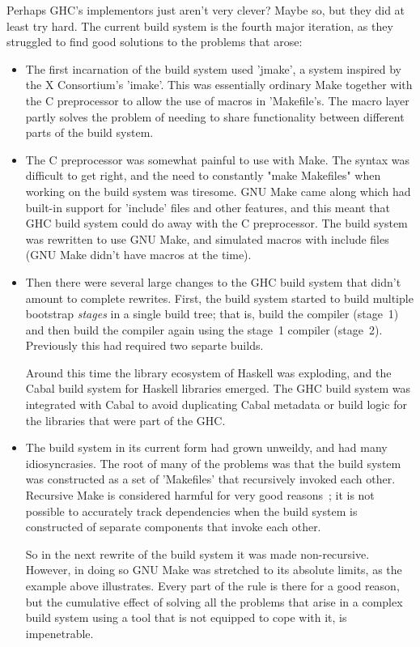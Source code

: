 Perhaps GHC's implementors just aren't very clever?  Maybe so, but
they did at least try hard. The current build system is the
fourth major iteration, as they struggled to find good solutions to the
problems that arose:

\begin{itemize}
\item The first incarnation of the build system used \lst'jmake', a
  system inspired by the X Consortium's \lst'imake'.  This was
  essentially ordinary Make together with the C preprocessor to
  allow the use of macros in \lst'Makefile's.  The macro layer partly
  solves the problem of needing to share functionality between
  different parts of the build system.

\item The C preprocessor was somewhat painful to use with Make.
  The syntax was difficult to get right, and the need to constantly
  \lst"make Makefiles" when working on the build system was tiresome.  GNU
  Make came along which had built-in support for \lst'include' files and
  other features, and this meant that GHC build system could do away with the C
  preprocessor. The build system was rewritten to use GNU Make, and
  simulated macros with include files (GNU Make didn't have macros at
  the time).

\item Then there were several large changes to the GHC build system
  that didn't amount to complete rewrites.  First, the build system started
  to build multiple bootstrap \emph{stages} in a single build tree; that is,
  build the compiler (stage~1) and then build the compiler again using the
  stage~1 compiler (stage~2). Previously this had required two separte builds.

  Around this time the library ecosystem of Haskell was exploding, and
  the Cabal build system for Haskell libraries emerged. The GHC build system was
  integrated with Cabal to avoid duplicating Cabal metadata or build logic for
  the libraries that were part of the GHC.

\item The build system in its current form had grown unweildy, and had
  many idiosyncrasies. The root of many of the problems was that the
  build system was constructed as a set of \lst'Makefiles' that recursively
  invoked each other. Recursive Make is considered harmful
  for very good reasons~\cite{miller:recursive_make}; it is not possible to
  accurately track dependencies when the build system is constructed
  of separate components that invoke each other.

  So in the next rewrite of the build system it was made non-recursive.
  However, in doing so GNU Make was stretched to its absolute
  limits, as the example above illustrates. Every part of the rule is
  there for a good reason, but the cumulative effect of solving all
  the problems that arise in a complex build system using a tool that
  is not equipped to cope with it, is impenetrable.
\end{itemize}
